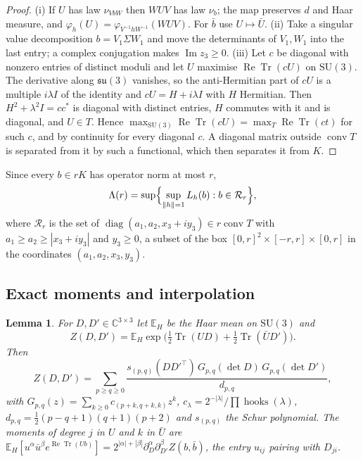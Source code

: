 \documentclass[11pt]{amsart}
\newtheorem{lemma}[theorem]{Lemma}
\theoremstyle{definition}
\theoremstyle{remark}
\numberwithin{equation}{section}
\newcommand{\C}{\mathbb{C}}
\newcommand{\E}{\mathbb{E}}
\newcommand{\SU}{\mathrm{SU}}
\newcommand{\Tr}{\operatorname{Tr}}
\newcommand{\ReTr}{\operatorname{Re}\operatorname{Tr}}
\begin{document}
\begin{proof}
(i) If $U$ has law $\nu_{VbW}$ then $WUV$ has law $\nu_b$; the map preserves
$d$ and Haar measure, and $\varphi_h(U)=\varphi_{V^{-1}hW^{-1}}(WUV)$. For
$\bar b$ use $U\mapsto\bar U$. (ii) Take a singular value decomposition
$b=V_1\Sigma W_1$ and move the determinants of $V_1,W_1$ into the last
entry; a complex conjugation makes $\operatorname{Im}z_3\ge0$. (iii) Let $c$ be
diagonal with nonzero entries of distinct moduli and let $U$ maximise
$\ReTr(cU)$ on $\SU(3)$. The derivative along $\mathfrak{su}(3)$ vanishes, so
the anti-Hermitian part of $cU$ is a multiple $i\lambda I$ of the identity
and $cU=H+i\lambda I$ with $H$ Hermitian. Then $H^2+\lambda^2I=cc^*$ is diagonal
with distinct entries, $H$ commutes with it and is diagonal, and $U\in T$.
Hence $\max_{\SU(3)}\ReTr(cU)=\max_T\ReTr(ct)$ for such $c$, and by continuity
for every diagonal $c$. A diagonal matrix outside $\operatorname{conv}T$ is
separated from it by such a functional, which then separates it from $K$.
\end{proof}

Since every $b\in rK$ has operator norm at most $r$,
\[
\Lambda(r)=\sup\Bigl\{\sup_{\|h\|=1}L_h(b):b\in\mathcal R_r\Bigr\},
\]
where $\mathcal R_r$ is the set of $\operatorname{diag}(a_1,a_2,x_3+iy_3)\in
r\operatorname{conv}T$ with $a_1\ge a_2\ge|x_3+iy_3|$ and $y_3\ge0$, a subset of
the box $[0,r]^2\times[-r,r]\times[0,r]$ in the coordinates
$(a_1,a_2,x_3,y_3)$.

\subsection{Exact moments and interpolation}

\begin{lemma}\label{lem:characters}
For $D,D'\in\C^{3\times3}$ let $\E_H$ be the Haar mean on $\SU(3)$ and
\[
Z(D,D')=\E_H\exp\bigl(\tfrac12\Tr(UD)+\tfrac12\Tr(\bar UD')\bigr).
\]
Then
\[
Z(D,D')=\sum_{p\ge q\ge0}\frac{s_{(p,q)}(DD'^{\top})\,G_{p,q}(\det D)\,
G_{p,q}(\det D')}{d_{p,q}} ,
\]
with $G_{p,q}(z)=\sum_{k\ge0}c_{(p+k,q+k,k)}z^k$, $c_\lambda=2^{-|\lambda|}/
\prod\operatorname{hooks}(\lambda)$, $d_{p,q}=\frac12(p-q+1)(q+1)(p+2)$ and
$s_{(p,q)}$ the Schur polynomial. The moments of degree $j$ in $U$ and $k$ in
$\bar U$ are $\E_H[u^\alpha\bar u^{\beta}e^{\ReTr(Ub)}]=2^{|\alpha|+|\beta|}
\partial_D^\alpha\partial_{D'}^{\beta}Z(b,\bar b)$, the entry $u_{ij}$ pairing with
$D_{ji}$.
\end{lemma}
\end{document}
